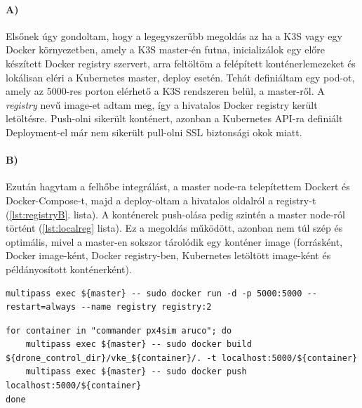\noindent
\paragraph{A)}
Elsőnek úgy gondoltam, hogy a legegyszerűbb megoldás az ha a K3S vagy egy Docker környezetben, amely a K3S master-én futna, inicializálok egy előre készített Docker registry szervert, arra feltöltöm a felépített konténerlemezeket és lokálisan eléri a Kubernetes master, deploy esetén. Tehát definiáltam egy pod-ot, amely az 5000-res porton elérhető a K3S rendszeren belül, a master-ről. A \emph{registry} nevű image-et adtam meg, így a hivatalos Docker registry került letöltésre. Push-olni sikerült konténert, azonban a Kubernetes API-ra definiált Deployment-el már nem sikerült pull-olni SSL biztonsági okok miatt. \\

\noindent
\paragraph{B)}
Ezután hagytam a felhőbe integrálást, a master node-ra telepítettem Dockert és Docker-Compose-t, majd a deploy-oltam a hivatalos oldalról a registry-t (\ref{lst:registryB}. lista). A konténerek push-olása pedig szintén a master node-ról történt (\ref{lst:localreg} lista). Ez a megoldás működött, azonban nem túl szép és optimális, mivel a master-en sokszor tárolódik egy konténer image (forrásként, Docker image-ként, Docker registry-ben, Kubernetes letöltött image-ként és példányosított konténerként).
\begin{minipage}{\linewidth}
\begin{lstlisting}[caption={Docker registry inicializálás a master docker környezetében},label={lst:registryB}]
multipass exec ${master} -- sudo docker run -d -p 5000:5000 --restart=always --name registry registry:2
\end{lstlisting}
\end{minipage}
\begin{minipage}{\linewidth}
\begin{lstlisting}[caption={Build és push lokál konténer registry-be},label={lst:localreg}]
for container in "commander px4sim aruco"; do
	multipass exec ${master} -- sudo docker build ${drone_control_dir}/vke_${container}/. -t localhost:5000/${container}
	multipass exec ${master} -- sudo docker push localhost:5000/${container}
done
\end{lstlisting}
\end{minipage}

